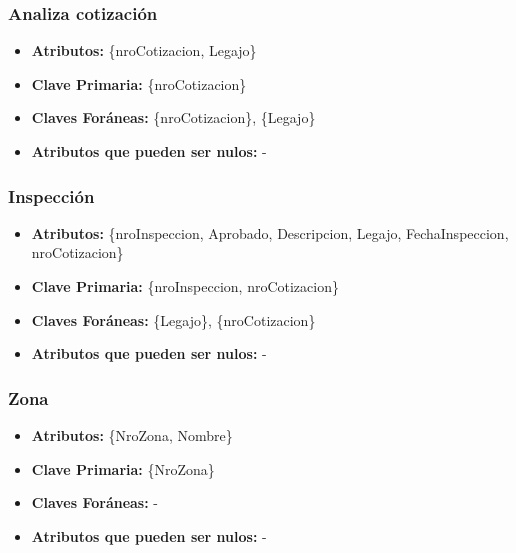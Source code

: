 \documentclass[a4paper,11pt]{article}
\begin{document}
\subsubsection{Analiza cotización}

\begin{itemize}

	\item \textbf{Atributos:} \{nroCotizacion, Legajo\}
	
	\item \textbf{Clave Primaria:} \{nroCotizacion\}
	
	\item \textbf{Claves Foráneas:} \{nroCotizacion\}, \{Legajo\}

	\item \textbf{Atributos que pueden ser nulos:} -
	
\end{itemize}

\subsubsection{Inspección}

\begin{itemize}

	\item \textbf{Atributos:} \{nroInspeccion, Aprobado, Descripcion, Legajo, FechaInspeccion, nroCotizacion\}
	
	\item \textbf{Clave Primaria:} \{nroInspeccion, nroCotizacion\}
	
	\item \textbf{Claves Foráneas:} \{Legajo\}, \{nroCotizacion\}

	\item \textbf{Atributos que pueden ser nulos:} -
	
\end{itemize}

\subsubsection{Zona}

\begin{itemize}

	\item \textbf{Atributos:} \{NroZona, Nombre\}
	
	\item \textbf{Clave Primaria:} \{NroZona\}
	
	\item \textbf{Claves Foráneas:} -

	\item \textbf{Atributos que pueden ser nulos:} -
	
\end{itemize}
\end{document}
